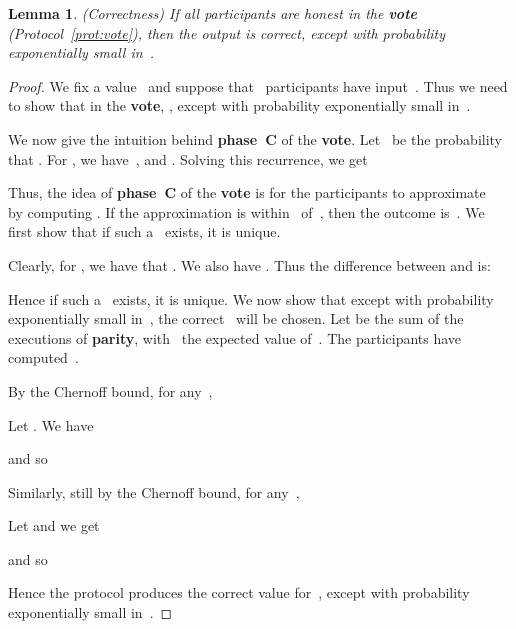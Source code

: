 \documentclass[11pt]{article}
\newtheorem{lemma}[theorem]{Lemma}
\begin{document}
\begin{lemma}(Correctness)
 If all participants are honest in  the \textbf{vote} (Protocol~\ref{prot:vote}),
then the output is correct, except with probability exponentially
small in~.
\end{lemma}




\begin{proof}
We fix a value~ and suppose that~ participants have
input~. Thus we need to show that  in the \textbf{vote},
,  except with probability exponentially small in~.

We now give the  intuition behind \textbf{phase~C} of the
\textbf{vote}. Let~ be the probability that
. For  , we
have~,  and . Solving this
recurrence, we get


Thus, the idea
 of \textbf{phase~C} of the \textbf{vote} is for the participants to approximate~ by computing
\mbox{}. If the approximation
is within~ of~, then the outcome
is~. We first show that if such a~ exists, it is
unique.

Clearly,  for , we have that . We also have
.
Thus the difference between  and  is:


Hence if
 such a~ exists, it is unique. We now show
that except with probability exponentially small in~, the
correct~ will be chosen. Let  be the sum
of the~ executions of \textbf{parity}, with~ the
expected value of~. The participants have computed  \,.



 By the
Chernoff bound, for any~\mbox{},

Let . We have

and so



 Similarly, still by the Chernoff
bound, for any~\mbox{},

Let  and we get

and so


Hence the protocol produces the correct value for~, except
with probability exponentially small in~.
\end{proof}
\end{document}
